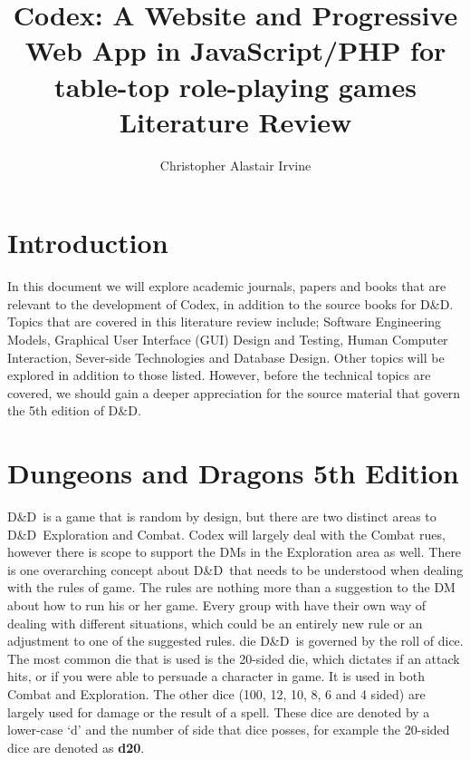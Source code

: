 \documentclass[review]{cmpreport}
\title{Codex: A Website and Progressive Web App in JavaScript/PHP for table-top role-playing games \\ Literature Review}
\author{Christopher Alastair Irvine}
\newcommand{\dnd}{D\&D}
\begin{document}
	\section{Introduction}
	In this document we will explore academic journals, papers and books that are relevant to the development of Codex, in addition to the source books for \dnd . Topics that are covered in this literature review include; Software Engineering Models, Graphical User Interface (GUI) Design and Testing, Human Computer Interaction, Sever-side Technologies and Database Design. Other topics will be explored in addition to those listed. However, before the technical topics are covered, we should gain a deeper appreciation for the source material that govern the 5th edition of \dnd . 
	
	\section{Dungeons and Dragons 5th Edition}
	\dnd \ is a game that is random by design, but there are two distinct areas to \dnd \, Exploration and Combat. Codex will largely deal with the Combat rues, however there is scope to support the DMs in the Exploration area as well. There is one overarching concept about \dnd \ that needs to be understood when dealing with the rules of game. The rules are nothing more than a suggestion to the DM about how to run his or her game. Every group with have their own way of dealing with different situations, which could be an entirely new rule or an adjustment to one of the suggested rules. die
	\dnd \ is governed by the roll of dice. The most common die that is used is the 20-sided die, which dictates if an attack hits, or if you were able to persuade a character in game. It is used in both Combat and Exploration. The other dice (100, 12, 10, 8, 6 and 4 sided) are largely used for damage or the result of a spell. These dice are denoted by a lower-case `d' and the number of side that dice posses, for example the 20-sided dice are denoted as \textbf{d20}.
	
\end{document}
